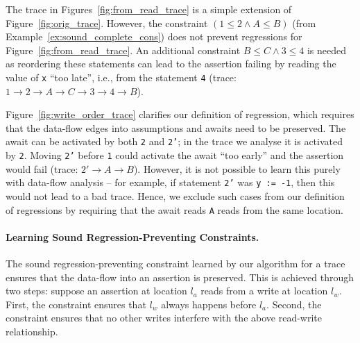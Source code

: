 \documentclass{llncs}
\newcommand\comment[1]{}
\newcommand\ProgCons{\ensuremath{\Phi}}
\begin{document}
\begin{example}
  \label{ex:non_locality}
  The trace in Figures~\ref{fig:from_read_trace} is a simple extension
  of Figure~\ref{fig:orig_trace}.
  However, the constraint $(1 \leq 2 \wedge A \leq B)$
  (from Example~\ref{ex:sound_complete_cons}) does not prevent
  regressions for Figure~\ref{fig:from_read_trace}.
  An additional constraint $B \leq C \wedge 3 \leq 4$ is needed as
  reordering these statements can lead to the assertion failing by
  reading the value of {\tt x} ``too late'', i.e., from the statement
  {\tt 4} (trace: $1 \to 2 \to A\to C \to 3 \to 4 \to B$).
  
  Figure~\ref{fig:write_order_trace} clarifies our definition of
  regression, which requires that the data-flow edges into
  assumptions and awaits need to be preserved.
  The await can be activated by both {\tt 2} and {\tt 2'}; in the trace
  we analyse it is activated by {\tt 2}.
  Moving {\tt 2'} before {\tt 1} could activate the await ``too early''
  and the assertion would fail (trace: $2'\to A\to B$).
  However, it is not possible to learn this purely with data-flow
  analysis -- for example, if statement {\tt 2'} was {\tt y := -1}, then
  this would not lead to a bad trace.
  Hence, we exclude such cases from our definition of regressions by
  requiring that the await reads {\tt A} reads from the same location.
\end{example}



\comment{
\begin{example}[Problems for over-approximation]
  Consider the modified version of the trace in
  Figure~\ref{fig:over_approx_trace}.
  Here, the constraint $\ProgCons^* = (A < B \wedge 1 < 2)
  \vee \SchedBefore{1}{B}$ is too strong, i.e., there are programs
  that violate the constraint and yet do not introduce regressions.
  The problem here is that the assertion may succeed even if the current
  version of the data-flow into the assertion is not respected -- even
  if the assertion reads the value of {\tt x} too early, i.e., from {\tt
  0'}, the assertion still succeeds.
\end{example}
}

\paragraph{Learning Sound Regression-Preventing Constraints.}
The sound regression-preventing constraint learned by our algorithm for
a trace ensures that the data-flow into an assertion is preserved.
This is achieved through two steps: suppose an assertion at location
$l_a$ reads from a write at location $l_w$. 
First, the constraint ensures that $l_w$ always happens before
$l_a$.
Second, the constraint ensures that no other writes 
interfere with the above read-write relationship.
\end{document}
